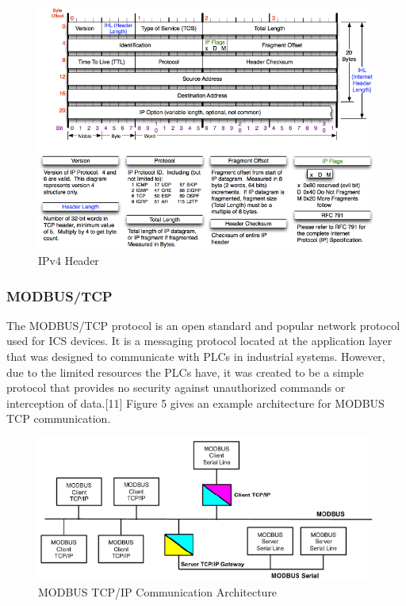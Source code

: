 \documentclass[12pt,]{article}
\begin{document}
\begin{figure}

{\centering \includegraphics{thesis_files/figure-latex/unnamed-chunk-7-1} 

}

\caption{IPv4 Header}\label{fig:unnamed-chunk-7}
\end{figure}

\subsubsection{MODBUS/TCP}\label{modbustcp}

The MODBUS/TCP protocol is an open standard and popular network protocol
used for ICS devices. It is a messaging protocol located at the
application layer that was designed to communicate with PLCs in
industrial systems. However, due to the limited resources the PLCs have,
it was created to be a simple protocol that provides no security against
unauthorized commands or interception of data.{[}11{]} Figure 5 gives an
example architecture for MODBUS TCP communication.

\begin{figure}

{\centering \includegraphics{thesis_files/figure-latex/unnamed-chunk-8-1} 

}

\caption{MODBUS TCP/IP Communication Architecture}\label{fig:unnamed-chunk-8}
\end{figure}
\end{document}
